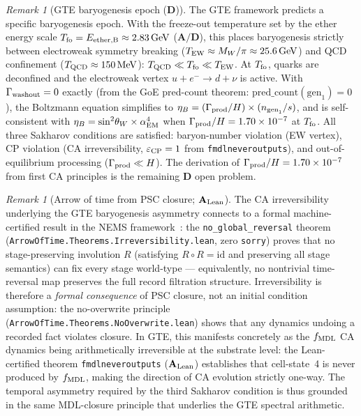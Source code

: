 \documentclass[11pt]{article}
\theoremstyle{remark}
\newtheorem{remark}[theorem]{Remark}
\newcommand{\lean}[1]{%
  \penalty-100
  \begingroup\def\_{\textunderscore\allowbreak}\texttt{#1}\endgroup}
\newcommand{\CatAL}{\ensuremath{\textbf{A}_{\rm Lean}}}
\newcommand{\CatAD}{\textbf{A/D}}
\newcommand{\CatD}{\textbf{D}}
\begin{document}
\begin{remark}[GTE baryogenesis epoch ($\CatD$)]
The GTE framework predicts a specific baryogenesis epoch. With the freeze-out temperature set by the ether energy scale $T_{\rm fo} = E_{\rm ether,B} \approx 2.83\,{\rm GeV}$ ($\CatAD$), this places baryogenesis strictly between electroweak symmetry breaking ($T_{\rm EW} \approx M_W/\pi \approx 25.6\,{\rm GeV}$) and QCD confinement ($T_{\rm QCD} \approx 150\,{\rm MeV}$): $T_{\rm QCD} \ll T_{\rm fo} \ll T_{\rm EW}$. At $T_{\rm fo}$, quarks are deconfined and the electroweak vertex $u + e^- \to d + \nu$ is active. With $\Gamma_{\rm washout} = 0$ exactly (from the GoE pred-count theorem: $\mathrm{pred\_count}(\mathrm{gen}_1) = 0$), the Boltzmann equation simplifies to $\eta_B = (\Gamma_{\rm prod}/H) \times (n_{\mathrm{gen}_1}/s)$, and is self-consistent with $\eta_B = \sin^2\!\theta_W \times \alpha_{\rm EM}^4$ when $\Gamma_{\rm prod}/H = 1.70 \times 10^{-7}$ at $T_{\rm fo}$. All three Sakharov conditions are satisfied: baryon-number violation (EW vertex), CP violation (CA irreversibility, $\varepsilon_{\rm CP} = 1$ from \lean{fmdl\_never\_outputs\_4}), and out-of-equilibrium processing ($\Gamma_{\rm prod} \ll H$). The derivation of $\Gamma_{\rm prod}/H = 1.70 \times 10^{-7}$ from first CA principles is the remaining $\CatD$ open problem.
\end{remark}

\begin{remark}[Arrow of time from PSC closure; $\CatAL$]
\label{rem:arrow_of_time_psc}
The CA irreversibility underlying the GTE baryogenesis asymmetry connects to a formal
machine-certified result in the NEMS framework~\cite{SpivackNEMS36}: the
\texttt{no\_global\_reversal} theorem
(\texttt{ArrowOfTime.Theorems.Irreversibility.lean}, zero \texttt{sorry}) proves that
no stage-preserving involution $R$ (satisfying $R \circ R = \mathrm{id}$ and preserving
all stage semantics) can fix every stage world-type --- equivalently, no nontrivial
time-reversal map preserves the full record filtration structure.
Irreversibility is therefore a \emph{formal consequence} of PSC closure, not an initial
condition assumption: the no-overwrite principle
(\texttt{ArrowOfTime.Theorems.NoOverwrite.lean}) shows that any dynamics undoing a
recorded fact violates closure.
In GTE, this manifests concretely as the $f_{\rm MDL}$ CA dynamics being arithmetically
irreversible at the substrate level: the Lean-certified theorem
\lean{fmdl\_never\_outputs\_4} ($\CatAL$) establishes that cell-state~4 is never produced
by $f_{\rm MDL}$, making the direction of CA evolution strictly one-way.
The temporal asymmetry required by the third Sakharov condition is thus grounded in the
same MDL-closure principle that underlies the GTE spectral arithmetic.
\end{remark}
\end{document}
